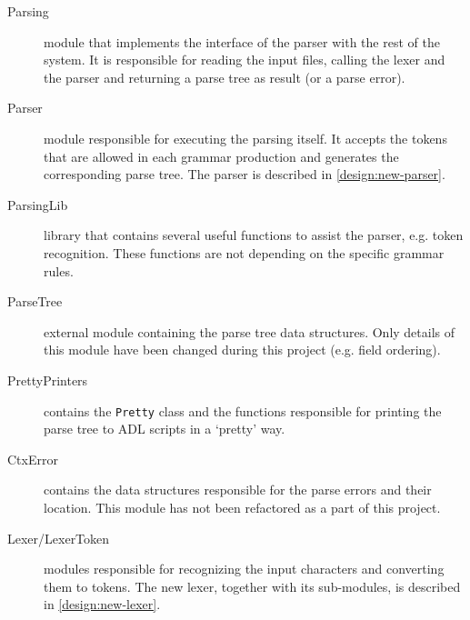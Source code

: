   \begin{description}
    \item[Parsing] module that implements the interface of the parser with the rest of the system.
      It is responsible for reading the input files, calling the lexer and the parser and returning a parse tree as result (or a parse error).

    \item[Parser] module responsible for executing the parsing itself.
      It accepts the tokens that are allowed in each grammar production and generates the corresponding parse tree.
      The parser is described in \autoref{design:new-parser}.
      
    \item[ParsingLib] library that contains several useful functions to assist the parser, e.g. token recognition.
      These functions are not depending on the specific grammar rules.
      
    \item[ParseTree] external module containing the parse tree data structures.
      Only details of this module have been changed during this project (e.g. field ordering).
    
    \item[PrettyPrinters] contains the \texttt{Pretty} class and the functions responsible for printing the parse tree to ADL scripts in a `pretty' way.
    
    \item[CtxError] contains the data structures responsible for the parse errors and their location.
      This module has not been refactored as a part of this project.
    
    \item[Lexer/LexerToken] modules responsible for recognizing the input characters and converting them to tokens.
      The new lexer, together with its sub-modules, is described in \autoref{design:new-lexer}.
  \end{description}
